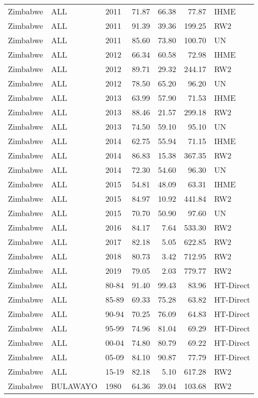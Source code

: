 \begin{longtable}{lllrrrl}
  Zimbabwe & ALL & 2011 & 71.87 & 66.38 & 77.87 & IHME \\ 
  Zimbabwe & ALL & 2011 & 91.39 & 39.36 & 199.25 & RW2 \\ 
  Zimbabwe & ALL & 2011 & 85.60 & 73.80 & 100.70 & UN \\ 
  Zimbabwe & ALL & 2012 & 66.34 & 60.58 & 72.98 & IHME \\ 
  Zimbabwe & ALL & 2012 & 89.71 & 29.32 & 244.17 & RW2 \\ 
  Zimbabwe & ALL & 2012 & 78.50 & 65.20 & 96.20 & UN \\ 
  Zimbabwe & ALL & 2013 & 63.99 & 57.90 & 71.53 & IHME \\ 
  Zimbabwe & ALL & 2013 & 88.46 & 21.57 & 299.18 & RW2 \\ 
  Zimbabwe & ALL & 2013 & 74.50 & 59.10 & 95.10 & UN \\ 
  Zimbabwe & ALL & 2014 & 62.75 & 55.94 & 71.15 & IHME \\ 
  Zimbabwe & ALL & 2014 & 86.83 & 15.38 & 367.35 & RW2 \\ 
  Zimbabwe & ALL & 2014 & 72.30 & 54.60 & 96.30 & UN \\ 
  Zimbabwe & ALL & 2015 & 54.81 & 48.09 & 63.31 & IHME \\ 
  Zimbabwe & ALL & 2015 & 84.97 & 10.92 & 441.84 & RW2 \\ 
  Zimbabwe & ALL & 2015 & 70.70 & 50.90 & 97.60 & UN \\ 
  Zimbabwe & ALL & 2016 & 84.17 & 7.64 & 533.30 & RW2 \\ 
  Zimbabwe & ALL & 2017 & 82.18 & 5.05 & 622.85 & RW2 \\ 
  Zimbabwe & ALL & 2018 & 80.73 & 3.42 & 712.95 & RW2 \\ 
  Zimbabwe & ALL & 2019 & 79.05 & 2.03 & 779.77 & RW2 \\ 
  Zimbabwe & ALL & 80-84 & 91.40 & 99.43 & 83.96 & HT-Direct \\ 
  Zimbabwe & ALL & 85-89 & 69.33 & 75.28 & 63.82 & HT-Direct \\ 
  Zimbabwe & ALL & 90-94 & 70.25 & 76.09 & 64.83 & HT-Direct \\ 
  Zimbabwe & ALL & 95-99 & 74.96 & 81.04 & 69.29 & HT-Direct \\ 
  Zimbabwe & ALL & 00-04 & 74.80 & 80.79 & 69.22 & HT-Direct \\ 
  Zimbabwe & ALL & 05-09 & 84.10 & 90.87 & 77.79 & HT-Direct \\ 
  Zimbabwe & ALL & 15-19 & 82.18 & 5.10 & 617.28 & RW2 \\ 
  Zimbabwe & BULAWAYO & 1980 & 64.36 & 39.04 & 103.68 & RW2 \\ 

\end{longtable}
